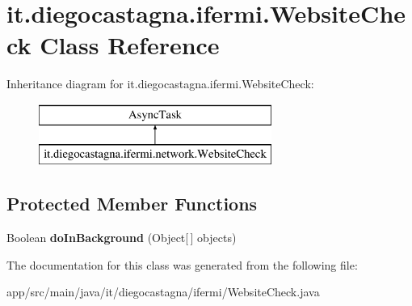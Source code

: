 \hypertarget{classit_1_1diegocastagna_1_1ifermi_1_1_website_check}{}\section{it.\+diegocastagna.\+ifermi.\+Website\+Check Class Reference}
\label{classit_1_1diegocastagna_1_1ifermi_1_1_website_check}
Inheritance diagram for it.\+diegocastagna.\+ifermi.\+Website\+Check\+:\begin{figure}[H]
\begin{center}
\leavevmode
\includegraphics[height=2.000000cm]{classit_1_1diegocastagna_1_1ifermi_1_1_website_check}
\end{center}
\end{figure}
\subsection*{Protected Member Functions}
\begin{DoxyCompactItemize}
\item 
\mbox{\label{classit_1_1diegocastagna_1_1ifermi_1_1_website_check_a89b82b6dfff4a21b165aecf861e5ca90}} 
Boolean {\bfseries do\+In\+Background} (Object\mbox{[}$\,$\mbox{]} objects)
\end{DoxyCompactItemize}


The documentation for this class was generated from the following file\+:\begin{DoxyCompactItemize}
\item 
app/src/main/java/it/diegocastagna/ifermi/Website\+Check.\+java\end{DoxyCompactItemize}
